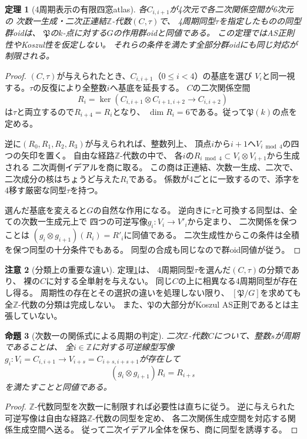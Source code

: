 \documentclass[11pt,a4paper]{ltjsarticle}
\newtheorem{theorem}{定理}[section]
\newtheorem{proposition}[theorem]{命題}
\theoremstyle{definition}
\newtheorem{remark}[theorem]{注意}
\newcommand{\ZZ}{\mathbb Z}
\begin{document}
\begin{theorem}[4周期表示の有限四窓atlas]\label{thm:four-window}
各$C_{i,i+1}$が4次元で各二次関係空間が6次元の
\emph{次数一生成・二次}正連結$\ZZ$-代数$(C,\tau)$で、
4周期同型$\tau$を指定したものの同型群oidは、
$\mathfrak P$の$k$-点に対する$G$の作用群oidと同値である。
この定理ではAS正則性やKoszul性を仮定しない。
それらの条件を満たす全部分群oidにも同じ対応が制限される。
\end{theorem}
\begin{proof}
$(C,\tau)$が与えられたとき、$C_{i,i+1}$（$0\le i<4$）の基底を選び
$V_i$と同一視する。$\tau$の反復により全整数$i$へ基底を延長する。
$C$の二次関係空間
\[
 R_i=\ker\left(C_{i,i+1}\otimes C_{i+1,i+2}
 \longrightarrow C_{i,i+2}\right)
\]
は$\tau$と両立するので$R_{i+4}=R_i$となり、
$\dim R_i=6$である。従って$\mathfrak P(k)$の点を定める。

逆に$(R_0,R_1,R_2,R_3)$が与えられれば、整数列上、
頂点$i$から$i+1$へ$V_{i\bmod4}$の四つの矢印を置く。
自由な経路$\ZZ$-代数の中で、
各$i$の$R_{i\bmod4}\subset V_i\otimes V_{i+1}$から生成される
二次両側イデアルを商に取る。
この商は正連結、次数一生成、二次で、
二次成分の核はちょうど与えた$R_i$である。
係数が4ごとに一致するので、添字を4移す厳密な同型$\tau$を持つ。

選んだ基底を変えると$G$の自然な作用になる。
逆向きに$\tau$と可換する同型は、全ての次数一生成元上で
四つの可逆写像$g_i:V_i\to V'_i$から定まり、
二次関係を保つことは
$(g_i\otimes g_{i+1})(R_i)=R'_i$に同値である。
二次生成性からこの条件は全積を保つ同型の十分条件でもある。
同型の合成も同じなので群oid同値が従う。
\end{proof}

\begin{remark}[分類上の重要な違い]\label{rem:forget4}
定理\ref{thm:four-window}は、
4周期同型$\tau$を選んだ$(C,\tau)$の分類であり、
裸の$C$に対する全単射を与えない。
同じ$C$の上に相異なる4周期同型が存在し得る。
周期性の存在とその選択の違いを処理しない限り、
$[\mathfrak P/G]$を求めても全$\ZZ$-代数の分類は完成しない。
また、$\mathfrak P$の大部分がKoszul AS正則であるとは主張していない。
\end{remark}

\begin{proposition}[次数一の関係式による周期の判定]\label{prop:period-relations}
二次$\ZZ$-代数$C$について、整数$s$が周期であることは、
全$i\in\ZZ$に対する可逆線型写像
$g_i:V_i=C_{i,i+1}\to V_{i+s}=C_{i+s,i+s+1}$が存在して
\[
 (g_i\otimes g_{i+1})R_i=R_{i+s}
\]
を満たすことと同値である。
\end{proposition}
\begin{proof}
$\ZZ$-代数同型を次数一に制限すれば必要性は直ちに従う。
逆に与えられた可逆写像は自由な経路$\ZZ$-代数の同型を定め、
各二次関係生成空間を対応する関係生成空間へ送る。
従って二次イデアル全体を保ち、商に同型を誘導する。
\end{proof}
\end{document}
